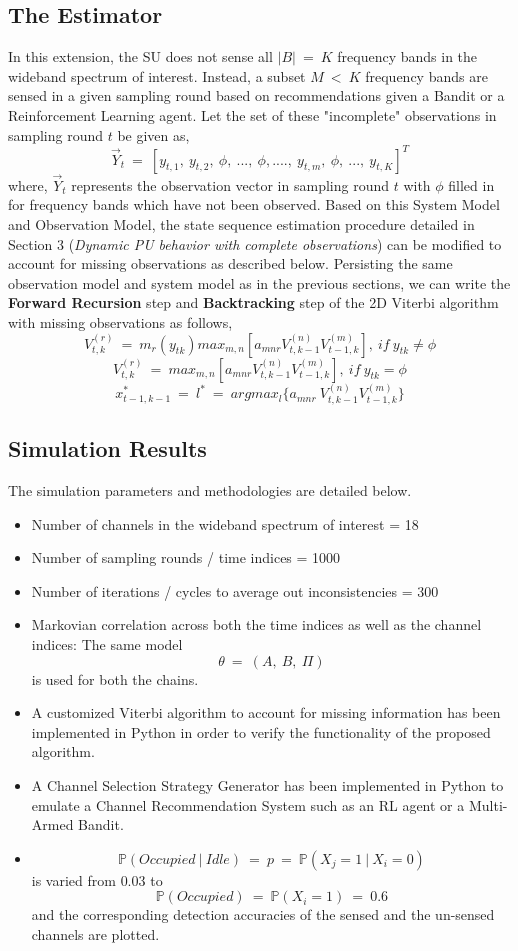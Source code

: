 \documentclass[12pt, draftcls, onecolumn]{IEEEtran}
\begin{document}
\subsection{The Estimator}
In this extension, the SU does not sense all $|B|\ =\ K$ frequency bands in the wideband spectrum of interest. Instead, a subset $M\ <\ K$ frequency bands are sensed in a given sampling round based on recommendations given a Bandit or a Reinforcement Learning agent. Let the set of these "incomplete" observations in sampling round $t$ be given as,
\[\vec{Y}_t\ =\ [y_{t,1},\ y_{t,2},\ \phi,\ ...,\ \phi,....,\ y_{t,m},\ \phi,\ ...,\ y_{t,K}]^T\]
where, $\vec{Y}_t$ represents the observation vector in sampling round $t$ with $\phi$ filled in for frequency bands which have not been observed.
Based on this System Model and Observation Model, the state sequence estimation procedure detailed in Section 3 (\textit{Dynamic PU behavior with complete observations}) can be modified to account for missing observations as described below.
Persisting the same observation model and system model as in the previous sections, we can write the \textbf{Forward Recursion} step and \textbf{Backtracking} step of the 2D Viterbi algorithm with missing observations as follows,
\[V_{t,k}^{(r)}\ =\ m_r(y_{tk})max_{m,n}[a_{mnr}V_{t,k-1}^{(n)}V_{t-1,k}^{(m)}],\ if\ y_{tk}\neq\phi\]
\[V_{t,k}^{(r)}\ =\ max_{m,n}[a_{mnr}V_{t,k-1}^{(n)}V_{t-1,k}^{(m)}],\ if\ y_{tk}=\phi\]
\[x_{t-1,k-1}^*\ =\ l^*\ =\ argmax_{l}\{a_{mnr}\ V_{t,k-1}^{(n)}V_{t-1,k}^{(m)}\}\]
\subsection{Simulation Results}
The simulation parameters and methodologies are detailed below.
\begin{itemize}
    \item Number of channels in the wideband spectrum of interest = 18
    \item Number of sampling rounds / time indices = 1000
    \item Number of iterations / cycles to average out inconsistencies = 300
    \item Markovian correlation across both the time indices as well as the channel indices: The same model \[\theta\ =\ (A,\ B,\ \Pi)\] is used for both the chains.
    \item A customized Viterbi algorithm to account for missing information has been implemented in Python in order to verify the functionality of the proposed algorithm.
    \item A Channel Selection Strategy Generator has been implemented in Python to emulate a Channel Recommendation System such as an RL agent or a Multi-Armed Bandit.
    \item \[\mathbb P(Occupied\ |\ Idle)\ =\ p\ =\ \mathbb P(X_j=1\ |\ X_i=0)\] is varied from $0.03$ to \[\mathbb P(Occupied)\ =\ \mathbb P(X_i=1)\ =\ 0.6\] and the corresponding detection accuracies of the sensed and the un-sensed channels are plotted.
\end{itemize}
\end{document}
